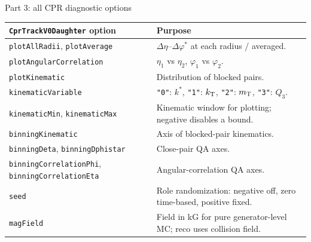 \begin{frame}{Part 3: all CPR diagnostic options}
 \footnotesize
 \renewcommand{\arraystretch}{1.08}
 \begin{tabular}{p{}p{}}
 \toprule
 \texttt{CprTrackV0Daughter} option & Purpose\\\midrule
 \texttt{plotAllRadii}, \texttt{plotAverage} & $\Delta\eta$--$\Delta\varphi^*$ at each radius / averaged.\\
 \texttt{plotAngularCorrelation} & $\eta_1$ vs $\eta_2$, $\varphi_1$ vs $\varphi_2$.\\
 \texttt{plotKinematic} & Distribution of blocked pairs.\\
 \texttt{kinematicVariable} & \texttt{"0"}: $k^*$, \texttt{"1"}: $k_{\rm T}$, \texttt{"2"}: $m_{\rm T}$, \texttt{"3"}: $Q_3$.\\
 \texttt{kinematicMin}, \texttt{kinematicMax} & Kinematic window for plotting; negative disables a bound.\\
 \texttt{binningKinematic} & Axis of blocked-pair kinematics.\\
 \texttt{binningDeta}, \texttt{binningDphistar} & Close-pair QA axes.\\
 \texttt{binningCorrelationPhi}, \texttt{binningCorrelationEta} & Angular-correlation QA axes.\\
 \texttt{seed} & Role randomization: negative off, zero time-based, positive fixed.\\
 \texttt{magField} & Field in kG for pure generator-level MC; reco uses collision field.\\\bottomrule
 \end{tabular}
\end{frame}

